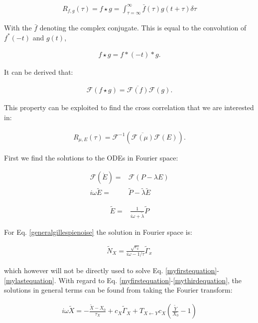 \documentclass[a4paper,twoside,10pt]{report}
\begin{document}
\begin{align}
R_{f,g}(\tau) = f \star g = \int_{\tau=\infty}^{\infty} {\bar f(\tau) g(t+\tau) \delta \tau}
\end{align}

With the $\bar{f}$ denoting the complex conjugate. This is equal to the convolution of $f^*(-t)$ and $g(t)$, 

\begin{align}
f \star g = f*(-t) * g
.
\end{align}

It can be derived that:

\begin{align}
\mathcal{F} (f \star g) = \overline{\mathcal{F} (f)} \mathcal{F}(g)
.
\end{align}

This property can be exploited to find the cross correlation that we are interested in:

\begin{align}
R_{\mu,E}(\tau) = \mathcal{F}^{-1} \left( \overline{\mathcal{F} (\mu)} \mathcal{F}(E) \right)
.
\end{align}

First we find the solutions to the ODEs in Fourier space:

\begin{align}
\label{ODEEFourier}
\mathcal{F} \left( \dot{E} \right) = & \mathcal{F} \left( P - \lambda E \right) \nonumber \\
%
i\omega \tilde{E} = & \tilde{P} - \tilde{\lambda} \tilde{E}
\end{align}

\begin{align}
 \tilde{E} = & \frac{1}{i\omega+\tilde{\lambda}} \tilde{P} 
\end{align}

For Eq. \ref{generalgillespienoise} the solution in Fourier space is:

\begin{align}
\tilde{N}_X = \frac{\sqrt{c_x}}{i\omega - 1/\tau} \tilde{\Gamma}_x
\end{align}

which however will not be directly used to solve Eq. \ref{myfirstequation}-\ref{mylastequation}. With regard to  Eq. \ref{myfirstequation}-\ref{mythirdequation}, the solutions in general terms can be found from taking the Fourier transform:

\begin{align}
i \omega \tilde{X} = - \frac{\tilde{X}-X_0}{\tau_X} + c_X \tilde{\Gamma}_X + T_{X \leftarrow Y} c_X (\frac{\tilde{Y}}{X_0} - 1)
\end{align}
\end{document}

